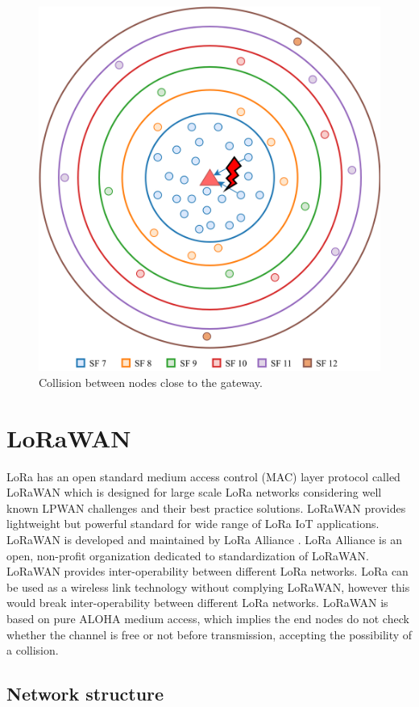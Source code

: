 \begin{figure}
\centering
\includegraphics[width=.7\linewidth]{fig/lora_single_gw_collision.png}
\vspace*{5mm}
\caption{Collision between nodes close to the gateway.}
\label{fig:collision}
\end{figure}


\section{LoRaWAN}

LoRa has an open standard medium access control (MAC) layer protocol called LoRaWAN which is designed for large scale LoRa networks considering well known LPWAN challenges and their best practice solutions. LoRaWAN provides lightweight but powerful standard for wide range of LoRa IoT applications. LoRaWAN is developed and maintained by LoRa Alliance \cite{lora_alliance}. LoRa Alliance is an open, non-profit organization dedicated to standardization of LoRaWAN. LoRaWAN provides inter-operability between different LoRa networks. LoRa can be used as a wireless link technology without complying LoRaWAN, however this would break inter-operability between different LoRa networks. LoRaWAN is based on pure ALOHA medium access, which implies the end nodes do not check whether the channel is free or not before transmission, accepting the possibility of a collision. 

\subsection{Network structure}


